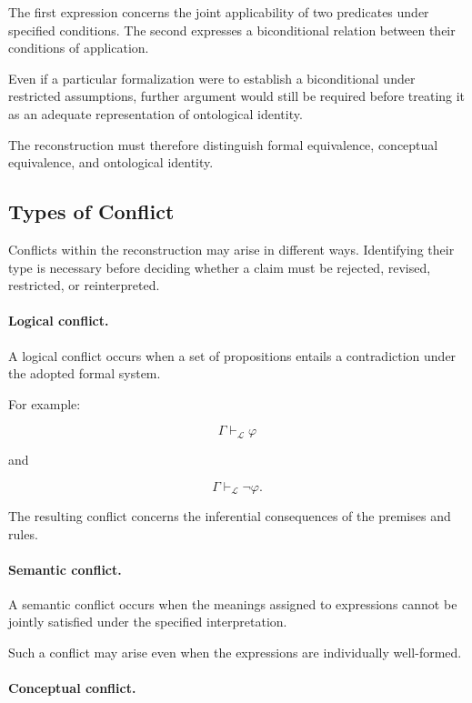 The first expression concerns the joint applicability
of two predicates under specified conditions. The second
expresses a biconditional relation between their conditions
of application.

Even if a particular formalization were to establish a
biconditional under restricted assumptions, further
argument would still be required before treating it as
an adequate representation of ontological identity.

The reconstruction must therefore distinguish formal
equivalence, conceptual equivalence, and ontological
identity.

\subsection{Types of Conflict}

Conflicts within the reconstruction may arise in different
ways. Identifying their type is necessary before deciding
whether a claim must be rejected, revised, restricted,
or reinterpreted.

\paragraph{Logical conflict.}

A logical conflict occurs when a set of propositions
entails a contradiction under the adopted formal system.

For example:

\[
    \Gamma \vdash_{\mathcal{L}} \varphi
\]

and

\[
    \Gamma \vdash_{\mathcal{L}} \neg\varphi.
\]

The resulting conflict concerns the inferential consequences
of the premises and rules.

\paragraph{Semantic conflict.}

A semantic conflict occurs when the meanings assigned
to expressions cannot be jointly satisfied under the
specified interpretation.

Such a conflict may arise even when the expressions
are individually well-formed.

\paragraph{Conceptual conflict.}

